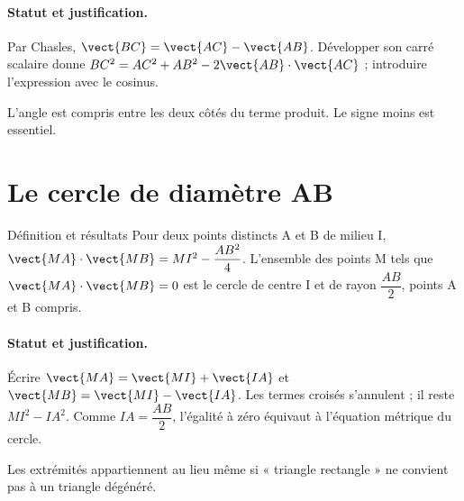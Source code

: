 \paragraph{Statut et justification.} Par Chasles, $\vect{BC}=\vect{AC}-\vect{AB}$. Développer son carré scalaire donne $BC^2=AC^2+AB^2-2\vect{AB}\cdot\vect{AC}$ ; introduire l’expression avec le cosinus.
\label{C03-EX4}
\begin{erreur}L’angle est compris entre les deux côtés du terme produit. Le signe moins est essentiel.\end{erreur}
\label{C03-AP4}
\section{Le cercle de diamètre AB}\label{C03-U5}
\begin{repere}{Définition et résultats}
Pour deux points distincts A et B de milieu I, $\vect {MA}\cdot \vect {MB}=MI^2-\dfrac{AB^2}{4}$. L’ensemble des points M tels que $\vect{MA}\cdot\vect{MB}=0$ est le cercle de centre I et de rayon $\dfrac{AB}{2}$, points A et B compris.
\end{repere}
\paragraph{Statut et justification.} Écrire $\vect{MA}=\vect{MI}+\vect{IA}$ et $\vect{MB}=\vect{MI}-\vect{IA}$. Les termes croisés s’annulent ; il reste $MI^2-IA^2$. Comme $IA=\dfrac{AB}{2}$, l’égalité à zéro équivaut à l’équation métrique du cercle.
\label{C03-EX5}

\begin{erreur}Les extrémités appartiennent au lieu même si « triangle rectangle » ne convient pas à un triangle dégénéré.\end{erreur}
\label{C03-AP5}

